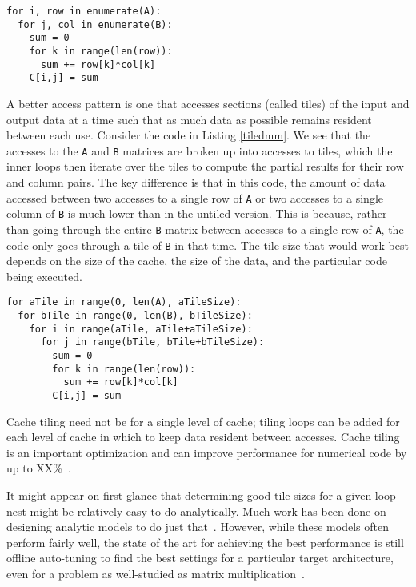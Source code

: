 \documentclass[preprint,9pt]{sigplanconf}
\begin{document}
\begin{lstlisting}[frame=single, label=untiledmm, caption={Untiled Matrix Multiply}, belowskip=0.5em]
for i, row in enumerate(A):
  for j, col in enumerate(B):
    sum = 0
    for k in range(len(row)):
      sum += row[k]*col[k]
    C[i,j] = sum
\end{lstlisting}

A better access pattern is one that accesses sections (called tiles) of the input and output data at a time such that as much data as possible remains resident between each use.  Consider the code in Listing \ref{tiledmm}.  We see that the accesses to the \lstinline{A} and \lstinline{B} matrices are broken up into accesses to tiles, which the inner loops then iterate over the tiles to compute the partial results for their row and column pairs.  The key difference is that in this code, the amount of data accessed between two accesses to a single row of \lstinline{A} or two accesses to a single column of \lstinline{B} is much lower than in the untiled version.  This is because, rather than going through the entire \lstinline{B} matrix between accesses to a single row of \lstinline{A}, the code only goes through a tile of \lstinline{B} in that time.  The tile size that would work best depends on the size of the cache, the size of the data, and the particular code being executed.

\begin{lstlisting}[frame=single, label=tiledmm, caption={Tiled Matrix Multiply}, belowskip=0.5em]
for aTile in range(0, len(A), aTileSize):
  for bTile in range(0, len(B), bTileSize):
    for i in range(aTile, aTile+aTileSize):
      for j in range(bTile, bTile+bTileSize):
        sum = 0
        for k in range(len(row)):
          sum += row[k]*col[k]
        C[i,j] = sum
\end{lstlisting}

Cache tiling need not be for a single level of cache; tiling loops can be added for each level of cache in which to keep data resident between accesses.  Cache tiling is an important optimization and can improve performance for numerical code by up to XX\%~\cite{Whal00}.

It might appear on first glance that determining good tile sizes for a given loop nest might be relatively easy to do analytically.  Much work has been done on designing analytic models to do just that~\cite{Cole95, Shir12, Yoto03, Yoto05}.  However, while these models often perform fairly well, the state of the art for achieving the best performance is still offline auto-tuning to find the best settings for a particular target architecture, even for a problem as well-studied as matrix multiplication~\cite{Whal00}.
\end{document}
